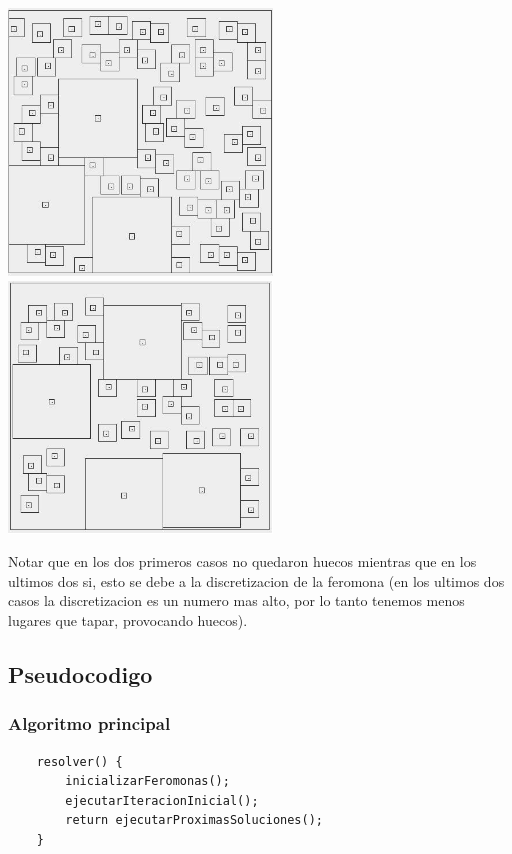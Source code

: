\begin{center}
\includegraphics[width=7cm]{imagenes/ejemplo6}
\includegraphics[width=7cm]{imagenes/ejemplo4}

\end{center}

Notar que en los dos primeros casos no quedaron huecos mientras que en los ultimos dos si, esto se debe a la discretizacion de la feromona (en los ultimos dos casos la discretizacion es un numero mas alto, por lo tanto tenemos menos lugares que tapar, provocando huecos).

\newpage


\subsection{Pseudocodigo}
\subsubsection{Algoritmo principal}

\begin{verbatim}
    resolver() {
        inicializarFeromonas();
        ejecutarIteracionInicial();
        return ejecutarProximasSoluciones();
    }
\end{verbatim}

